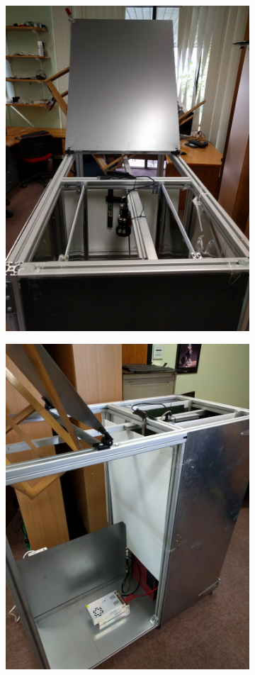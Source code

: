 \documentclass[fleqn,twoside,12pt]{report}
\begin{document}
\begin{figure}[h]
	\centering
	\begin{subfigure}{.5\textwidth}
		\centering
		\includegraphics[width=.9\linewidth]{system_v2_construct_1.jpg}
		\caption{}
		\label{fig:system_v2_construct_1}
	\end{subfigure}%
	\begin{subfigure}{.5\textwidth}
		\centering
		\includegraphics[width=0.9\linewidth]{system_v2_construct_2.jpg}

\end{subfigure}
\end{figure}
\end{document}
